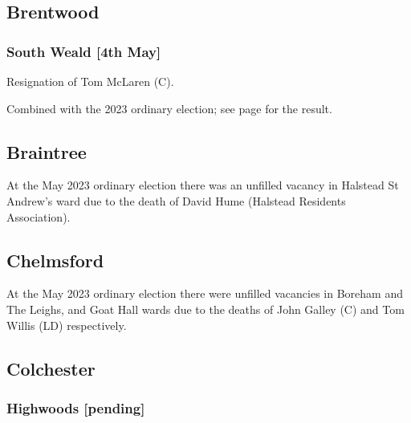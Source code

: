 \documentclass[a4paper,openany]{book}
\begin{document}
\begin{resultsiii}
\subsection*{Brentwood}

\subsubsection*{South Weald \hspace*{\fill}\nolinebreak[1]%
	\enspace\hspace*{\fill}
	[4th May]}


Resignation of Tom McLaren (C).

Combined with the 2023 ordinary election; see page \pageref{SouthWealdBrentwood} for the result.

\subsection*{Braintree}

At the May 2023 ordinary election there was an unfilled vacancy in Halstead St Andrew's ward due to the death of David Hume (Halstead Residents Association).%

\subsection*{Chelmsford}

At the May 2023 ordinary election there were unfilled vacancies in Boreham and The Leighs, and Goat Hall wards due to the deaths of John Galley (C) and Tom Willis (LD) respectively.%
%

\subsection*{Colchester}

\subsubsection*{Highwoods \hspace*{\fill}\nolinebreak[1]%
	\enspace\hspace*{\fill}
	[pending]}


\end{resultsiii}
\end{document}
